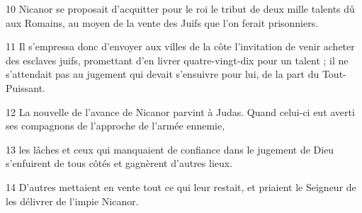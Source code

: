 10 Nicanor se proposait d’acquitter pour le roi le tribut de deux mille talents dû aux Romains, au moyen de la vente des Juifs que l’on ferait prisonniers.

11 Il s’empressa donc d’envoyer aux villes de la côte l’invitation de venir acheter des esclaves juifs, promettant d’en livrer quatre-vingt-dix pour un talent ; il ne s’attendait pas au jugement qui devait s’ensuivre pour lui, de la part du Tout-Puissant.

12 La nouvelle de l’avance de Nicanor parvint à Judas. Quand celui-ci eut averti ses compagnons de l’approche de l’armée ennemie,

13 les lâches et ceux qui manquaient de confiance dans le jugement de Dieu s’enfuirent de tous côtés et gagnèrent d’autres lieux.

14 D’autres mettaient en vente tout ce qui leur restait, et priaient le Seigneur de les délivrer de l’impie Nicanor.
